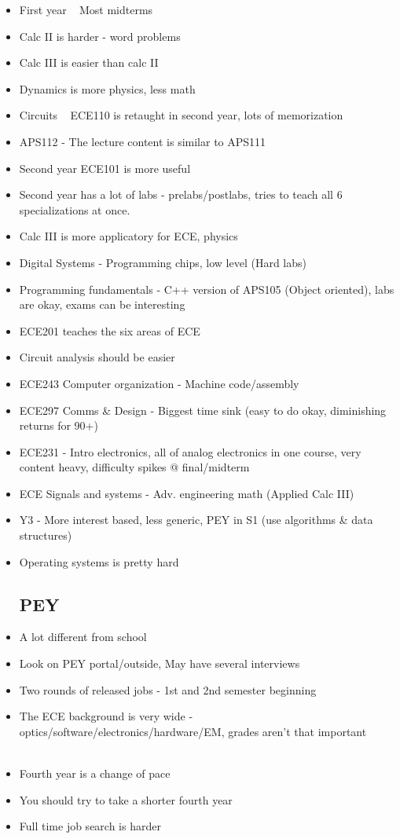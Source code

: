 \documentclass{article}
\begin{document}
\begin{itemize}
    \item First year ~ Most midterms
    \item Calc II is harder - word problems
    \item Calc III is easier than calc II
    \item Dynamics is more physics, less math
    \item Circuits ~ ECE110 is retaught in second year, lots of memorization
    \item APS112 - The lecture content is similar to APS111
    \item Second year ECE101 is more useful
    \item Second year has a lot of labs - prelabs/postlabs, tries to teach all 6 specializations at once.
    \item Calc III is more applicatory for ECE, physics
    \item Digital Systems - Programming chips, low level (Hard labs)
    \item Programming fundamentals - C++ version of APS105 (Object oriented), labs are okay, exams can be interesting
    \item ECE201 teaches the six areas of ECE
    \item Circuit analysis should be easier
    \item ECE243 Computer organization - Machine code/assembly
    \item ECE297 Comms \& Design - Biggest time sink (easy to do okay, diminishing returns for 90+)
    \item ECE231 - Intro electronics, all of analog electronics in one course, very content heavy, difficulty spikes @ final/midterm
    \item ECE Signals and systems - Adv. engineering math (Applied Calc III)
    \item Y3 - More interest based, less generic, PEY in S1 (use algorithms \& data structures)
    \item Operating systems is pretty hard
    \subsection{PEY}
    \item A lot different from school
    \item Look on PEY portal/outside, May have several interviews
    \item Two rounds of released jobs - 1st and 2nd semester beginning
    \item The ECE background is very wide - optics/software/electronics/hardware/EM, grades aren't that important\\\\
    \item Fourth year is a change of pace
    \item You should try to take a shorter fourth year
    \item Full time job search is harder




\end{itemize}
\end{document}
